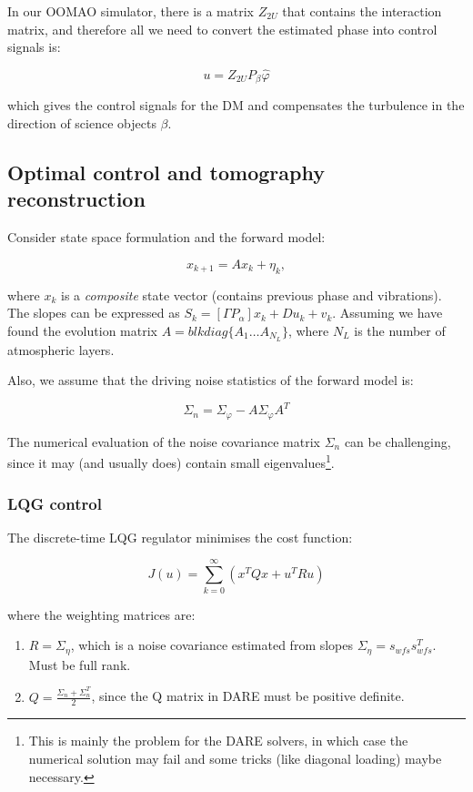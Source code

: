 \documentclass[a4paper,12pt]{article}
\begin{document}
In our OOMAO simulator, there is a matrix $Z_{2U}$ that contains the interaction matrix, and therefore all we need to convert the estimated phase into control signals is:

\begin{equation}
 u = Z_{2U} P_\beta \hat{\varphi}
\end{equation}

which gives the control signals for the DM and compensates the turbulence in the direction of science objects $\beta$.



\subsection{Optimal control and tomography reconstruction}
Consider state space formulation and the forward model:

$$x_{k+1} = A x_k + \eta_k,$$

where $x_k$ is a \textit{composite} state vector (contains previous phase and vibrations). The slopes can be expressed as $S_k = [\Gamma P_\alpha] x_k + D u_k + v_k$. Assuming we have found the evolution matrix $A = blkdiag\{ A_{1} \dots  A_{N_L}\}$, where $N_L $ is the number of atmospheric layers.

Also, we assume that the driving noise statistics of the forward model is:

\begin{equation}
 \Sigma_n = \Sigma_\varphi - A \Sigma_\varphi A^T
\end{equation} 

The numerical evaluation of the noise covariance matrix $\Sigma_n$ can be challenging, since it may (and usually does) contain small eigenvalues\footnote{This is mainly the problem for the DARE solvers, in which case the numerical solution may fail and some tricks (like diagonal loading) maybe necessary.}.

\subsubsection{LQG control}
The discrete-time LQG regulator minimises the cost function:

\begin{equation}
 J(u) = \sum\limits_{k=0}^{\infty} \left(x^T Q x + u^T R u \right)
\end{equation} 

where the weighting matrices are:

\begin{enumerate}
 \item $R = \Sigma_\eta$, which is a noise covariance estimated from slopes $\Sigma_\eta = s_{wfs} s_{wfs}^T$. Must be full rank.
 \item $Q = \frac{\Sigma_n + \Sigma_n^T}{2}$, since the Q matrix in DARE must be positive definite.
\end{enumerate}
\end{document}
